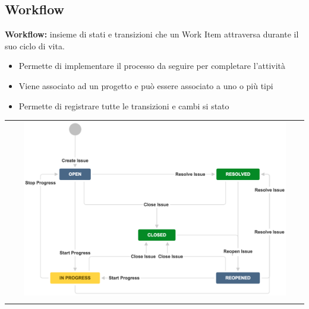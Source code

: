 \subsection{Workflow}
\begin{mdframed}
    \textbf{Workflow:} insieme di stati e transizioni che un Work Item attraversa durante il suo ciclo di vita.
\end{mdframed}
\begin{itemize}
    \item Permette di implementare il processo da seguire per completare l'attività
    \item Viene associato ad un progetto e può essere associato a uno o più tipi
    \item Permette di registrare tutte le transizioni e cambi si stato
\end{itemize}
\begin{center}
    \begin{tabular}{c}
        \\ \includegraphics[width=0.9\textwidth]{images/ITS1.png} \\ \\
    \end{tabular}
\end{center}

